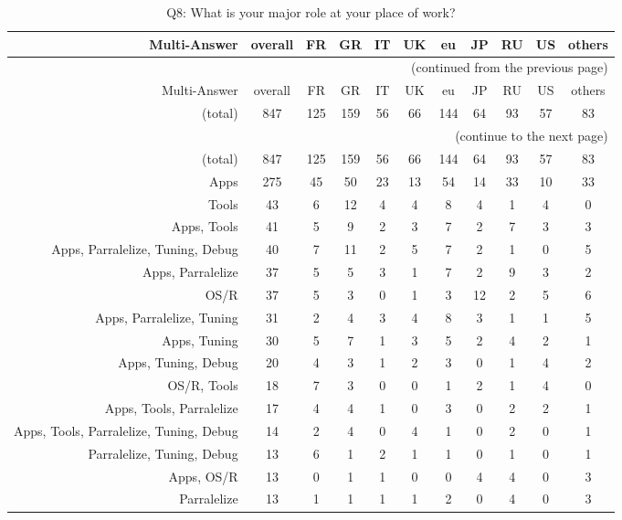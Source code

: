 \clearpage%
{\footnotesize\begin{landscape}%
\begin{longtable}[htb]{r|c|c|c|c|c|c|c|c|c|c}%
\caption{Q8: What is your major role at your place of work?}%
\label{tab:Q8-mans} \\%
\hline%
Multi-Answer & overall & FR & GR & IT & UK & eu & JP & RU & US & others \\
 \hline%
\endfirsthead%
\multicolumn{11}{r}{(continued from the previous page)}\\%
\hline%
Multi-Answer & overall & FR & GR & IT & UK & eu & JP & RU & US & others \\
 \hline%
\endhead%
\hline%
(total) & 847 & 125 & 159 & 56 & 66 & 144 & 64 & 93 & 57 & 83 \\%
\hline%
\multicolumn{11}{r}{(continue to the next page)}\\%
\endfoot%
\hline%
(total) & 847 & 125 & 159 & 56 & 66 & 144 & 64 & 93 & 57 & 83 \\%
\hline%
\endlastfoot%
\hline%
{Apps} & 275 & 45 & 50 & 23 & 13 & 54 & 14 & 33 & 10 & 33 \\%
{Tools} & 43 & 6 & 12 & 4 & 4 & 8 & 4 & 1 & 4 & 0 \\%
{Apps, Tools} & 41 & 5 & 9 & 2 & 3 & 7 & 2 & 7 & 3 & 3 \\%
{Apps, Parralelize, Tuning, Debug} & 40 & 7 & 11 & 2 & 5 & 7 & 2 & 1 & 0 & 5 \\%
{Apps, Parralelize} & 37 & 5 & 5 & 3 & 1 & 7 & 2 & 9 & 3 & 2 \\%
{OS/R} & 37 & 5 & 3 & 0 & 1 & 3 & 12 & 2 & 5 & 6 \\%
{Apps, Parralelize, Tuning} & 31 & 2 & 4 & 3 & 4 & 8 & 3 & 1 & 1 & 5 \\%
{Apps, Tuning} & 30 & 5 & 7 & 1 & 3 & 5 & 2 & 4 & 2 & 1 \\%
{Apps, Tuning, Debug} & 20 & 4 & 3 & 1 & 2 & 3 & 0 & 1 & 4 & 2 \\%
{OS/R, Tools} & 18 & 7 & 3 & 0 & 0 & 1 & 2 & 1 & 4 & 0 \\%
{Apps, Tools, Parralelize} & 17 & 4 & 4 & 1 & 0 & 3 & 0 & 2 & 2 & 1 \\%
{Apps, Tools, Parralelize, Tuning, Debug} & 14 & 2 & 4 & 0 & 4 & 1 & 0 & 2 & 0 & 1 \\%
{Parralelize, Tuning, Debug} & 13 & 6 & 1 & 2 & 1 & 1 & 0 & 1 & 0 & 1 \\%
{Apps, OS/R} & 13 & 0 & 1 & 1 & 0 & 0 & 4 & 4 & 0 & 3 \\%
{Parralelize} & 13 & 1 & 1 & 1 & 1 & 2 & 0 & 4 & 0 & 3 \\%

\end{longtable}
\end{landscape}}
